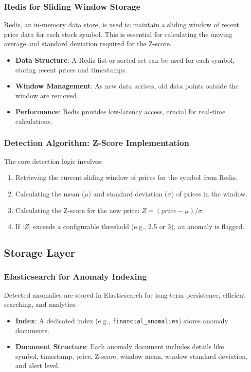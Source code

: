 \subsubsection{Redis for Sliding Window Storage}

Redis, an in-memory data store, is used to maintain a sliding window of recent price data for each stock symbol. This is essential for calculating the moving average and standard deviation required for the Z-score.
\begin{itemize}
    \item \textbf{Data Structure}: A Redis list or sorted set can be used for each symbol, storing recent prices and timestamps.
    \item \textbf{Window Management}: As new data arrives, old data points outside the window are removed.
    \item \textbf{Performance}: Redis provides low-latency access, crucial for real-time calculations.
\end{itemize}

\subsubsection{Detection Algorithm: Z-Score Implementation}

The core detection logic involves:
\begin{enumerate}
    \item Retrieving the current sliding window of prices for the symbol from Redis.
    \item Calculating the mean ($\mu$) and standard deviation ($\sigma$) of prices in the window.
    \item Calculating the Z-score for the new price: $Z = (price - \mu) / \sigma$.
    \item If $|Z|$ exceeds a configurable threshold (e.g., 2.5 or 3), an anomaly is flagged.
\end{enumerate}

\subsection{Storage Layer}

\subsubsection{Elasticsearch for Anomaly Indexing}

Detected anomalies are stored in Elasticsearch for long-term persistence, efficient searching, and analytics.
\begin{itemize}
    \item \textbf{Index}: A dedicated index (e.g., \texttt{financial\_anomalies}) stores anomaly documents.
    \item \textbf{Document Structure}: Each anomaly document includes details like symbol, timestamp, price, Z-score, window mean, window standard deviation, and alert level.
\end{itemize}

